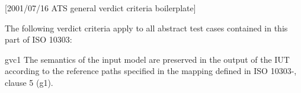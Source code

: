 [2001/07/16 ATS general verdict criteria boilerplate]

    The following verdict criteria apply to all abstract test cases
contained in this part of ISO 10303:

gvc1 The semantics of the input model are preserved in the output of
     the IUT according to the reference paths specified in the mapping
     \maptableorspec{} defined in ISO 10303-\theAPpartno, clause 5 (g1).

\par

\endinput
